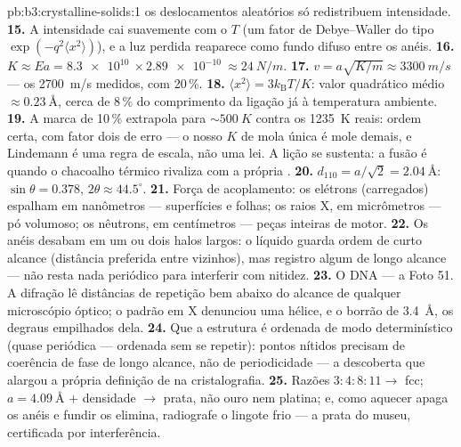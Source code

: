 \begin{solution}{pb:b3:crystalline-solids:1}
os deslocamentos aleatórios só redistribuem intensidade.
\textbf{15.} A intensidade cai suavemente com o $T$ (um fator de
Debye--Waller do tipo $\exp(-q^2\langle x^2\rangle)$), e a
luz perdida reaparece como fundo difuso entre os anéis.
\textbf{16.} $K \approx Ea = \qty{8.3e10}{}\times
\qty{2.89e-10}{} \approx \qty{24}{N/m}$.
\textbf{17.} $v = a\sqrt{K/m} \approx \qty{3300}{m/s}$ ---
os \qty{2700}{m/s} medidos, com 20\,\%.
\textbf{18.} $\langle x^2\rangle = 3k_{\text{B}}T/K$: valor quadrático
médio $\approx\qty{0.23}{\angstrom}$, cerca de 8\,\% do comprimento da
ligação já à temperatura ambiente.
\textbf{19.} A marca de 10\,\% extrapola para $\sim\qty{500}{K}$
contra os \qty{1235}{K} reais: ordem certa, com fator dois de erro
--- o nosso $K$ de mola única é mole demais, e Lindemann é uma regra de
escala, não uma lei. A lição se sustenta: a fusão é quando o
chacoalho térmico rivaliza com a própria .
\textbf{20.} $d_{110} = a/\sqrt2 = \qty{2.04}{\angstrom}$:
$\sin\theta = 0.378$, $2\theta \approx 44.5^\circ$.
\textbf{21.} Força de acoplamento: os elétrons (carregados) espalham em
nanômetros --- superfícies e folhas; os raios X, em micrômetros ---
pó volumoso; os nêutrons, em centímetros --- peças inteiras de motor.
\textbf{22.} Os anéis desabam em um ou dois halos largos:
o líquido guarda ordem de curto alcance (distância preferida entre
vizinhos), mas registro algum de longo alcance --- não resta nada
periódico para interferir com nitidez.
\textbf{23.} O DNA --- a Foto 51. A difração lê distâncias de
repetição bem abaixo do alcance de qualquer microscópio óptico; o padrão
em X denunciou uma hélice, e o borrão de \qty{3.4}{\angstrom}, os
degraus empilhados dela.
\textbf{24.} Que a estrutura é ordenada de modo determinístico
(quase periódica --- ordenada sem se repetir): pontos nítidos precisam
de coerência de fase de longo alcance, não de periodicidade --- a
descoberta que alargou a própria definição de  na cristalografia.
\textbf{25.} Razões $3:4:8:11 \to$ fcc; $a = \qty{4.09}{\angstrom}$
$+$ densidade $\to$ prata, não ouro nem platina; e, como aquecer
apaga os anéis e fundir os elimina, radiografe o lingote frio ---
a prata do museu, certificada por interferência.
\end{solution}

